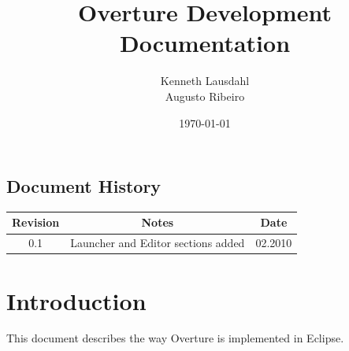 \documentclass{overturerep}
\begin{document}
 
\title{Overture Development Documentation}
\author{Kenneth Lausdahl\\
        Augusto Ribeiro}

\date{\today}

{}     

\maketitle
\tableofcontents
\newpage
% 




\section{Document History}
\begin{center}
\begin{tabular}{|c|c|c|}
\hline
\textbf{Revision} & \textbf{Notes} & \textbf{Date} \\ \hline
0.1 & Launcher and Editor sections added & 02.2010 \\ \hline
\end{tabular}
\end{center}


\setcounter{page}{1}

\chapter{Introduction}
This document describes the way Overture is implemented in Eclipse.











\end{document}
